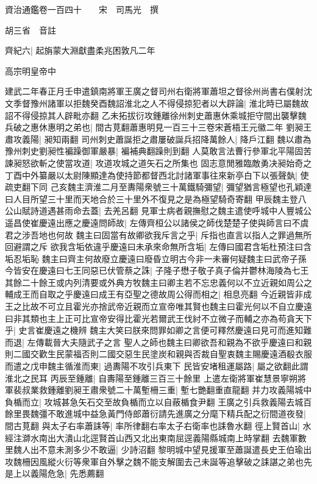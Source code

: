 資治通鑑卷一百四十　　宋　司馬光　撰

胡三省　音註

齊紀六|{
	起旃蒙大淵獻盡柔兆困敦凡二年}


高宗明皇帝中

建武二年春正月壬申遣鎮南將軍王廣之督司州右衛將軍蕭坦之督徐州尚書右僕射沈文季督豫州諸軍以拒魏癸酉魏詔淮北之人不得侵掠犯者以大辟論|{
	淮北時已屬魏故詔不得侵掠其人辟毗亦翻}
乙未拓拔衍攻鍾離徐州刺史蕭惠休乘城拒守間出襲擊魏兵破之惠休惠明之弟也|{
	間古莧翻蕭惠明見一百三十三卷宋蒼梧王元徽二年}
劉昶王肅攻義陽|{
	昶知兩翻}
司州刺史蕭誕拒之肅屢破誕兵招降萬餘人|{
	降戶江翻}
魏以肅為豫州刺史劉昶性褊躁御軍嚴暴|{
	褊補典翻躁則到翻}
人莫敢言法曹行參軍北平陽固苦諫昶怒欲斬之使當攻道|{
	攻道攻城之道矢石之所集也}
固志意閒雅臨敵勇决昶始奇之丁酉中外纂嚴以太尉陳顯達為使持節都督西北討諸軍事往來新亭白下以張聲埶|{
	使疏吏翻下同}
己亥魏主濟淮二月至夀陽衆號三十萬鐵騎彌望|{
	彌望猶言極望也孔穎達曰人目所望三十里而天地合於三十里外不復見之是為極望騎奇寄翻}
甲辰魏主登八公山賦詩道遇甚雨命去蓋|{
	去羌呂翻}
見軍士病者親撫慰之魏主遣使呼城中人豐城公遥昌使崔慶遠出應之慶遠問師故|{
	左傳齊桓公以諸侯之師伐楚楚子使與師言曰不虞君之涉吾地也何故}
魏主曰固當有故卿欲我斥言之乎|{
	斥指也直言以指人之罪過無所回避謂之斥}
欲我含垢依違乎慶遠曰未承來命無所含垢|{
	左傳曰國君含垢杜預注曰含垢忍垢恥}
魏主曰齊主何故廢立慶遠曰廢昏立明古今非一未審何疑魏主曰武帝子孫今皆安在慶遠曰七王同惡已伏管蔡之誅|{
	子隆子懋子敬子真子倫并鬱林海陵為七王}
其餘二十餘王或内列清要或外典方牧魏主曰卿主若不忘忠義何以不立近親如周公之輔成王而自取之乎慶遠曰成王有亞聖之德故周公得而相之|{
	相息亮翻}
今近親皆非成王之比故不可立且霍光亦捨武帝近親而立宣帝唯其賢也魏主曰霍光何以不自立慶遠曰非其類也主上正可比宣帝安得比霍光若爾武王伐紂不立微子而輔之亦為苟貪天下乎|{
	史言崔慶遠之機辨}
魏主大笑曰朕來問罪如卿之言便可釋然慶遠曰見可而進知難而退|{
	左傳載晉大夫隨武子之言}
聖人之師也魏主曰卿欲吾和親為不欲乎慶遠曰和親則二國交歡生民蒙福否則二國交惡生民塗炭和親與否裁自聖衷魏主賜慶遠酒殽衣服而遣之戊申魏主循淮而東|{
	過夀陽不攻引兵東下}
民皆安堵租運屬路|{
	屬之欲翻此謂淮北之民耳}
丙辰至鍾離|{
	自夀陽至鍾離三百三十餘里}
上遣左衛將軍崔慧景寧朔將軍裴叔業救鍾離劉昶王肅衆號二十萬塹柵三重|{
	塹七艷翻重直龍翻}
并力攻義陽城中負楯而立|{
	攻城甚急矢石交至故負楯而立以自蔽楯食尹翻}
王廣之引兵救義陽去城百餘里畏魏彊不敢進城中益急黃門侍郎蕭衍請先進廣之分麾下精兵配之衍間道夜發|{
	間古莧翻}
與太子右率蕭誄等|{
	率所律翻右率太子右衛率也誄魯水翻}
徑上賢首山|{
	水經注溮水南出大潰山北逕賢首山西又北出東南屈逕義陽縣城南上時掌翻}
去魏軍數里魏人出不意未測多少不敢逼|{
	少詩沼翻}
黎明城中望見援軍至蕭誕遣長史王伯瑜出攻魏柵因風縱火衍等衆軍自外擊之魏不能支解圍去己未誕等追擊破之誄諶之弟也先是上以義陽危急|{
	先悉薦翻}
